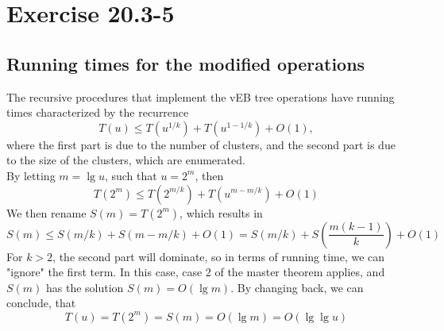 \section*{Exercise 20.3-5}
\subsection*{Running times for the modified operations}

The recursive procedures that implement the vEB tree operations have running times characterized by the recurrence
$$
T(u) \leq T(u^{1/k}) + T(u^{1-1/k}) + O(1),
$$
where the first part is due to the number of clusters, and the second part is due to the size of the clusters, which are enumerated.
\\
By letting $m=\lg u$, such that $u=2^m$, then
$$
T(2^m) \leq T(2^{m/k}) + T(u^{m-m/k}) + O(1)
$$
We then rename $S(m)=T(2^m)$, which results in
$$
S(m) \leq S(m/k) + S(m-m/k) + O(1) = S(m/k) + S\left(\frac{m(k-1)}{k}\right) + O(1)
$$
For $k>2$, the second part will dominate, so in terms of running time, we can "ignore" the first term. In this case, case 2 of the master theorem applies, and $S(m)$ has the solution $S(m)=O(\lg m)$.
By changing back, we can conclude, that
$$
T(u) = T(2^m) = S(m) = O(\lg m) = O(\lg\lg u)
$$